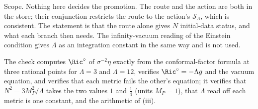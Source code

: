 Scope. Nothing here decides the promotion. The route and the action are both in the store; their conjunction restricts the route to the action's $\mathcal{S}_{\Lambda}$, which is consistent. The statement is that the route alone gives $N$ initial-data status, and what each branch then needs. The infinity-vacuum reading of the Einstein condition gives $\Lambda$ as an integration constant in the same way and is not used.

The check computes $\Ric^{\circ}$ of $\sigma^{-2}\eta$ exactly from the conformal-factor formula at three rational points for $\Lambda = 3$ and $\Lambda = 12$, verifies $\Ric^{\circ} = -\Lambda g$ and the vacuum equation, and verifies that each metric fails the other's equation; it verifies that $N^{2} = 3M_{P}^{2}/\Lambda$ takes the two values $1$ and $\tfrac14$ (units $M_{P} = 1$), that $\Lambda$ read off each metric is one constant, and the arithmetic of (iii).

